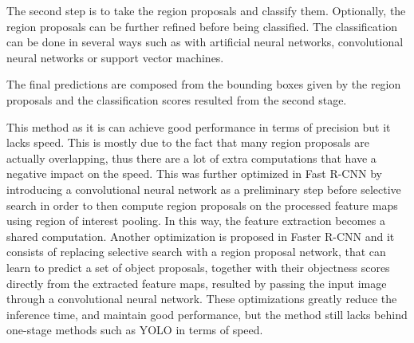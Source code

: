 The second step is to take the region proposals and classify them. Optionally, the region proposals can be further refined before being classified. The classification can be done in several ways such as with artificial neural networks, convolutional neural networks or support vector machines.

The final predictions are composed from the bounding boxes given by the region proposals and the classification scores resulted from the second stage.

This method as it is can achieve good performance in terms of precision but it lacks speed. This is mostly due to the fact that many region proposals are actually overlapping, thus there are a lot of extra computations that have a negative impact on the speed. This was further optimized in Fast R-CNN \cite{fastRcnn} by introducing a convolutional neural network as a preliminary step before selective search in order to then compute region proposals on the processed feature maps using region of interest pooling. In this way, the feature extraction becomes a shared computation. Another optimization is proposed in Faster R-CNN \cite{fasterRcnn} and it consists of replacing selective search with a region proposal network, that can learn to predict a set of object proposals, together with their objectness scores directly from the extracted feature maps, resulted by passing the input image through a convolutional neural network. These optimizations greatly reduce the inference time, and maintain good performance, but the method still lacks behind one-stage methods such as YOLO in terms of speed.


